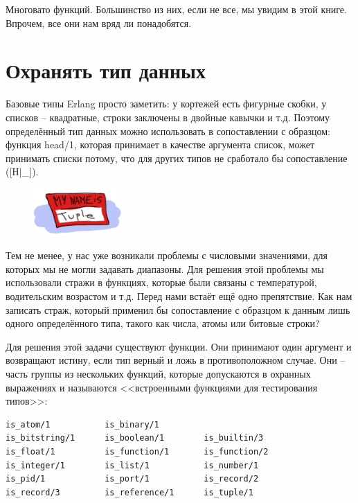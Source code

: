 \documentclass[a4paper,12pt]{report}
\newcommand{\ops}{\colorbox{lgreen}}
\begin{document}
Многовато функций. Большинство из них, если не все, мы увидим в этой книге. Впрочем, все они нам вряд ли понадобятся.
\section{Охранять тип данных}
Базовые типы Erlang просто заметить: у кортежей есть фигурные скобки, у списков \--- квадратные, строки заключены в двойные кавычки и т.д. Поэтому определённый тип данных можно использовать в сопоставлении с образцом: функция \ops{head/1}, которая принимает в качестве аргумента список, может принимать списки потому, что для других типов не сработало бы сопоставление (\ops{[H|\_]}).
\begin{figure}[h!]
    \includegraphics[width=0.3\textwidth]{my-name-is.png}
\end{figure} 

Тем не менее, у нас уже возникали проблемы с числовыми значениями, для которых мы не могли задавать диапазоны. Для решения этой проблемы мы использовали стражи в функциях, которые были связаны с температурой, водительским возрастом и т.д. Перед нами встаёт ещё одно препятствие. Как нам записать страж, который применил бы сопоставление с образцом к данным лишь одного определённого типа, такого как числа, атомы или битовые строки?

Для решения этой задачи существуют функции. Они принимают один аргумент и возвращают истину, если тип верный и ложь в противоположном случае. Они \--- часть группы из нескольких функций, которые допускаются в охранных выражениях и называются <<встроенными функциями для тестирования типов>>:
\begin{lstlisting}[style=erlang]
is_atom/1           is_binary/1        
is_bitstring/1      is_boolean/1        is_builtin/3       
is_float/1          is_function/1       is_function/2      
is_integer/1        is_list/1           is_number/1        
is_pid/1            is_port/1           is_record/2        
is_record/3         is_reference/1      is_tuple/1        
\end{lstlisting}
\end{document}
